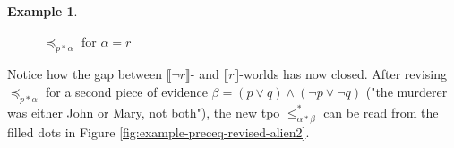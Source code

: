 \documentclass[english, 12pt]{scrartcl}
\theoremstyle{definition}
\newtheorem{example}{Example}
\theoremstyle{definition}
\theoremstyle{definition}
\newcommand{\modelsOf}[1]{\llbracket #1 \rrbracket}
\begin{document}
\begin{example}
\begin{figure}[H]
            \caption{$\preceq_{p \ast \alpha}$ for $\alpha = r$}
            \label{fig:example-preceq-revised-alien}
    \end{figure}
    
    Notice how the gap between $\modelsOf{\neg r}$- and $\modelsOf{r}$-worlds has now closed. After revising $\preceq_{p \ast \alpha}$ for a second piece of evidence $\beta = (p \vee q) \wedge (\neg p \vee \neg q)$ ("the murderer was either John or Mary, not both"), the new tpo $\leq_{\alpha \ast \beta}^{\ast}$ can be read from the filled dots in Figure \ref{fig:example-preceq-revised-alien2}.
    

\end{example}
\end{document}
